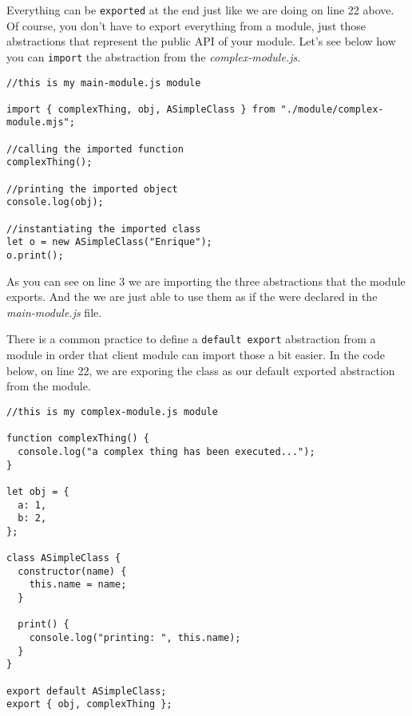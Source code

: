 \documentclass[a4paper, oneside, titlepage, 12pt]{book}
\begin{document}
Everything can be \texttt{exported} at the end just like we are doing on line 22 above. Of course, you don't have to export everything from a module, just those abstractions that represent the public API of your module. Let's see below how you can \texttt{import} the abstraction from the \textit{complex-module.js}.

\begin{verbatim}
//this is my main-module.js module

import { complexThing, obj, ASimpleClass } from "./module/complex-module.mjs";

//calling the imported function
complexThing();

//printing the imported object
console.log(obj);

//instantiating the imported class
let o = new ASimpleClass("Enrique");
o.print();
\end{verbatim}

As you can see on line 3 we are importing the three abstractions that the module exports. And the we are just able to use them as if the were declared in the \textit{main-module.js} file.

There is a common practice to define a \texttt{default export} abstraction from a module in order that client module can import those a bit easier. In the code below, on line 22, we are exporing the class as our default exported abstraction from the module.

\begin{verbatim}
//this is my complex-module.js module

function complexThing() {
  console.log("a complex thing has been executed...");
}

let obj = {
  a: 1,
  b: 2,
};

class ASimpleClass {
  constructor(name) {
    this.name = name;
  }

  print() {
    console.log("printing: ", this.name);
  }
}

export default ASimpleClass;
export { obj, complexThing };
\end{verbatim}
\end{document}

